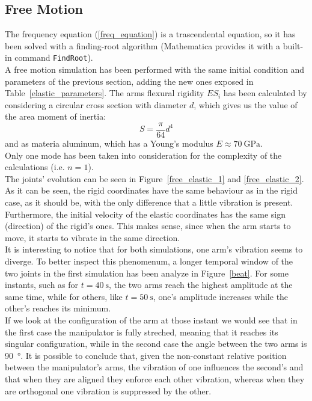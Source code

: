 \documentclass[a4paper,12pt,oneside]{report}
\begin{document}
\subsection{Free Motion}
The frequency equation (\ref{freq_equation}) is a trascendental equation, so it has been solved with a finding-root algorithm (Mathematica provides it with a built-in command \texttt{FindRoot}).\\
A free motion simulation has been performed with the same initial condition and parameters of the previous section, adding the new ones exposed in Table~\ref{elastic_parameters}. The arms flexural rigidity $ES_i$ has been calculated by considering a circular cross section with diameter $d$, which gives us the value of the area moment of inertia:
\begin{equation}
  S=\frac{\pi}{64}d^4
\end{equation}
and as materia aluminum, which has a Young's modulus $E\approx \SI{70}{\giga\pascal}$.\\
Only one mode has been taken into consideration for the complexity of the calculations (i.e. $n=1$).\\
The joints' evolution can be seen in Figure~\ref{free_elastic_1} and \ref{free_elastic_2}.\\
As it can be seen, the rigid coordinates have the same behaviour as in the rigid case, as it should be, with the only difference that a little vibration is present.\\
Furthermore, the initial velocity of the elastic coordinates has the same sign (direction) of the rigid's ones. This makes sense, since when the arm starts to move, it starts to vibrate in the same direction.\\
It is interesting to notice that for both simulations, one arm's vibration seems to diverge. To better inspect this phenomenum, a longer temporal window of the two joints in the first simulation has been analyze in Figure~\ref{beat}. For some instants, such as for $t=\SI{40}{\second}$, the two arms reach the highest amplitude at the same time, while for others, like $t=\SI{50}{\second}$, one's amplitude increases while the other's reaches its minimum.\\
If we look at the configuration of the arm at those instant we would see that in the first case the manipulator is fully streched, meaning that it reaches its singular configuration, while in the second case the angle between the two arms is \SI{90}{\degree}. It is possible to conclude that, given the non-constant relative position between the manipulator's arms, the vibration of one influences the second's and that when they are aligned they enforce each other vibration, whereas when they are orthogonal one vibration is suppressed by the other.
\end{document}
